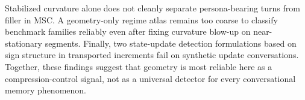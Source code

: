 \documentclass[11pt]{article}
\begin{document}
Stabilized curvature alone does not cleanly separate persona-bearing turns from filler in MSC. A geometry-only regime atlas remains too coarse to classify benchmark families reliably even after fixing curvature blow-up on near-stationary segments. Finally, two state-update detection formulations based on sign structure in transported increments fail on synthetic update conversations. Together, these findings suggest that geometry is most reliable here as a compression-control signal, not as a universal detector for every conversational memory phenomenon.
\end{document}
